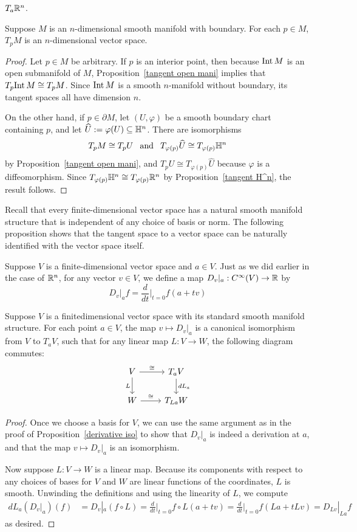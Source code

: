 $T_a\mathbb{R}^n$.
\begin{proposition}
Suppose $M$ is an $n$-dimensional smooth manifold with boundary. For each $p\in M$, $T_pM$ is an $n$-dimensional vector space.
\end{proposition}
\begin{proof}
Let $p\in M$ be arbitrary. If $p$ is an interior point, then because $\mathrm{Int}\, M$ is an open submanifold of $M$, Proposition~\ref{tangent open mani} implies that $T_p\mathrm{Int}\, M\cong T_pM$. Since $\mathrm{Int}\, M$ is a smooth $n$-manifold without boundary, its tangent spaces all have dimension $n$.\par
On the other hand, if $p\in\partial M$, let $(U,\varphi)$ be a smooth boundary chart containing $p$, and let $\widehat{U}:=\varphi(U)\subseteq\mathbb{H}^n$. There are isomorphisms 
\[T_pM\cong T_pU\hspace{8pt}\text{and}\hspace{8pt} T_{\varphi(p)}\widehat{U}\cong T_{\varphi(p)}\mathbb{H}^n\] 
by Proposition~\ref{tangent open mani}, and $T_pU\cong T_{\varphi(p)}\widehat{U}$ because $\varphi$ is a diffeomorphism. Since $T_{\varphi(p)}\mathbb{H}^n\cong T_{\varphi(p)}\mathbb{R}^n$ by Proposition~\ref{tangent H^n}, the result follows.
\end{proof}
Recall that every finite-dimensional vector space has a natural smooth manifold structure that is independent of any choice of basis or norm. The following proposition shows that the tangent space to a vector space can be naturally identified with the vector space itself.\par
Suppose $V$ is a finite-dimensional vector space and $a\in V$. Just as we did earlier in the case of $\mathbb{R}^n$, for any vector $v\in V$, we define a map $D_v|_a:C^\infty(V)\to\mathbb{R}$ by
\[D_v|_af=\frac{d}{dt}\Big|_{t=0}f(a+tv)\]
\begin{proposition}
Suppose $V$ is a finitedimensional vector space with its standard smooth manifold structure. For each point $a\in V$, the map $v\mapsto D_v|_a$ is a canonical isomorphism from $V$ to $T_aV$, such that for any linear map $L:V\to W$, the following diagram commutes:
\[\begin{tikzcd}
V\ar[r,"\cong"]\ar[d,swap,"L"]&T_aV\ar[d,"dL_a"]\\
W\ar[r,"\cong"]&T_{La}W
\end{tikzcd}\]
\end{proposition}
\begin{proof}
Once we choose a basis for $V$, we can use the same argument as in the proof of Proposition~\ref{derivative iso} to show that $D_v|_a$ is indeed a derivation at $a$, and that the map $v\mapsto D_v|_a$ is an isomorphism.\par
Now suppose $L:V\to W$ is a linear map. Because its components with respect to any choices of bases for $V$ and $W$ are linear functions of the coordinates, $L$ is smooth. Unwinding the definitions and using the linearity of $L$, we compute
\begin{align*}
dL_a(D_v|_a)(f)&=D_v|_a(f\circ L)=\frac{d}{dt}\Big|_{t=0}f\circ L(a+tv)=\frac{d}{dt}\Big|_{t=0}f(La+tLv)=D_{Lv}|_{La}f
\end{align*}
as desired.
\end{proof}
